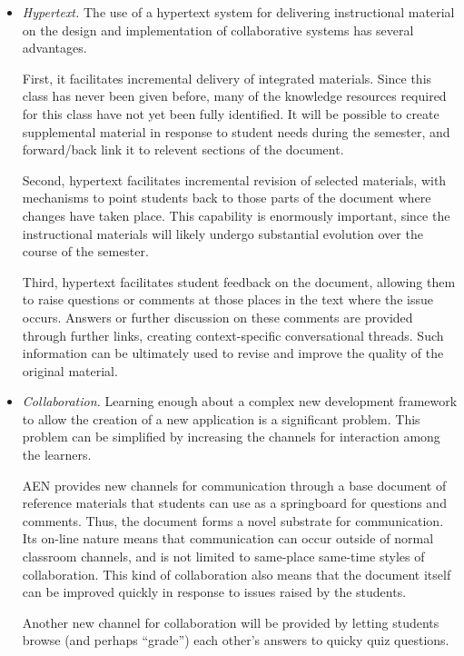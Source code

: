 \begin{itemize}
\item {\em Hypertext.} The use of a hypertext system for delivering
  instructional material on the design and implementation of collaborative
  systems has several advantages.  
  
  First, it facilitates incremental delivery of integrated
  materials.  Since this class has never been given before, many of
  the knowledge resources required for this class have not yet been
  fully identified.  It will be possible to create supplemental
  material in response to student needs during the semester, and
  forward/back link it to relevent sections of the document.
  
  Second, hypertext facilitates incremental revision of selected
  materials, with mechanisms to point students back to those parts
  of the document where changes have taken place.  This capability
  is enormously important, since the instructional materials will
  likely undergo substantial evolution over the course of the
  semester.
  
  Third, hypertext facilitates student feedback on the document,
  allowing them to raise questions or comments at those places in
  the text where the issue occurs.  Answers or further discussion on
  these comments are provided through further links, creating
  context-specific conversational threads.  Such information can be
  ultimately used to revise and improve the quality of the original
  material.
  
\item {\em Collaboration.} Learning enough about a complex new
  development framework to allow the creation of a new application
  is a significant problem.  This problem can be simplified by
  increasing the channels for interaction among the learners.
  
  AEN provides new channels for communication through a
  base document of reference materials that students can use as a
  springboard for questions and comments. Thus, the document
  forms a novel substrate for communication.  Its on-line nature means
  that communication can occur outside of normal classroom channels, and
  is not limited to same-place same-time styles of collaboration.  This
  kind of collaboration also means that the document itself can be
  improved quickly in response to issues raised by the students.
  
  Another new channel for collaboration will be provided by letting
  students browse (and perhaps ``grade'') each other's answers to quicky
  quiz questions.  
  

\end{itemize}
